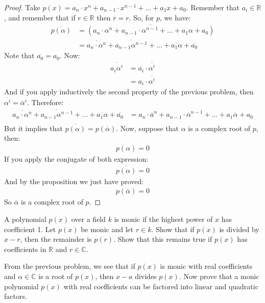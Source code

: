 \documentclass{tufte-handout}
\begin{document}
\begin{proof}
	Take $p(x) = a_{n} \cdot x^n + a_{n-1} \cdot x^{n-1} + \dots + a_1 x + a_0$. Remember that $a_i \in \mathbb{R}$, and remember that if $r \in \mathbb{R}$ then $\overline{r} = r$. So, for $p$, we have:
	\begin{align*}
		\overline{p(\alpha)} &= \overline{(a_{n} \cdot \alpha^n + a_{n-1} \cdot \alpha^{n-1} + \dots + a_1 \alpha + a_0)}\\
		&= \overline{a_n \cdot \alpha^n} + \overline{a_{n-1} \alpha^{n-1}} + \dots + \overline{a_1 \alpha} + \overline{a_0}
	\end{align*}
	Note that $\overline{a_0} = a_0$. Now:
	\begin{align*}
		\overline{a_i \alpha^i} &= \overline{a_i} \cdot \overline{\alpha^i}\\
		&= a_i \cdot \overline{\alpha^i}
	\end{align*} 
	And if you apply inductively the second property of the previous problem, then $\overline{\alpha^i} = \overline{\alpha}^i$. Therefore:
	\begin{align*}
		\overline{a_n \cdot \alpha^n} + \overline{a_{n-1} \alpha^{n-1}} + \dots + \overline{a_1 \alpha} + \overline{a_0} &= a_n \cdot \overline{a}^n + a_{n-1} \cdot \overline{\alpha}^{n-1} + \dots + a_1 \overline{\alpha} + a_0\\
	\end{align*}
	But it implies that $\overline{p(\alpha)} = p(\overline{\alpha})$. Now, suppose that $\alpha$ is a complex root of $p$, then:
	\begin{align*}
		p(\alpha) = 0
	\end{align*}
	If you apply the conjugate of both expression:
	\begin{align*}
		\overline{p(\alpha)} = 0
	\end{align*}
	And by the proposition we just have proved:
	\begin{align*}
		p(\overline{\alpha}) = 0
	\end{align*}
	So $\overline{\alpha}$ is a complex root of $p$.
\end{proof}

\begin{problem}
	A polynomial $p(x)$ over a field $k$ is monic if the highest power of $x$ has coefficient 1. Let $p(x)$ be monic and let $r \in k$. Show that if $p(x)$ is divided by $x-r$, then the remainder is $p(r)$. Show that this remains true if $p(x)$ has coefficients in $\mathbb{R}$ and $r \in \mathbb{C}$.
\end{problem}


\begin{problem}
	From the previous problem, we see that if $p(x)$ is monic with real coefficients and $\alpha \in \mathbb{C}$ is a root of $p(x)$, then $x-a$ divides $p(x)$. Now prove that a monic polynomial $p(x)$ with real coefficients can be factored into linear and quadratic factors.
\end{problem}
\end{document}
